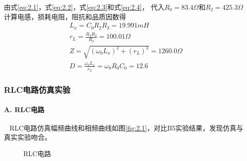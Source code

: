 \documentclass[10pt,a4paper,twocolumn,twoside,UTF8]{ctexart}
\begin{document}
			由式\ref{eq:2.1}，式\ref{eq:2.2}，式\ref{eq:2.3}和式\ref{eq:2.4}，
			代入$R_0 = 83.4 \Omega $和$R_2 = 425.3 \Omega $计算电感，损耗电阻，阻抗和品质因数得
				\begin{gather}
					L_x = C_0R_2R_3 = 19.991 mH\\
					r_L = \frac{R_3R_2}{R_0} = 100.01 \Omega \\
					Z = \sqrt{(\omega_0 L_x)^2+(r_L)^2} = 1260.0 \Omega \\
					D = \frac{\omega_0L_x}{r_L} = \omega_0R_0C_0 = 12.6
				\end{gather}
		\subsubsection{RLC电路仿真实验}
			\paragraph{A. RLC电路}~
			\newline 
			\indent
			RLC电路仿真幅频曲线和相频曲线如图\ref{fig:2.1}，对比B5实验结果，发现仿真与真实实验吻合。
			\begin{figure}[htbp]
				\centering
				
				\caption{RLC电路}
			\end{figure}
\end{document}
